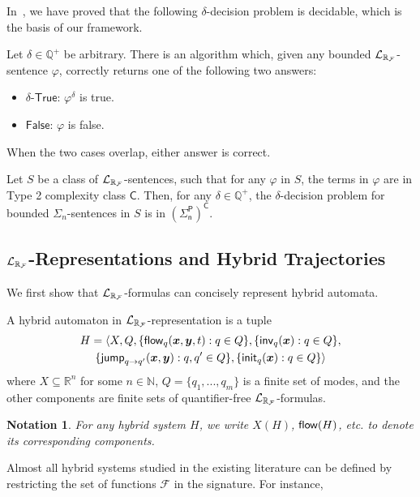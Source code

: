 \documentclass[10pt,envcountsect]{llncs}
\newtheorem{notation}[theorem]{Notation}
\begin{document}
In~\cite{DBLP:conf/lics/GaoAC12,DBLP:conf/cade/GaoAC12}, we have proved that the following $\delta$-decision problem is decidable, which is the basis of our framework.
\begin{theorem}\label{delta-decide} Let $\delta\in\mathbb{Q}^+$ be
arbitrary. There is an algorithm which, given any bounded $\mathcal{L}_{\mathbb{R}_{\mathcal{F}}}$-sentence $\varphi$,
correctly returns one of the following two answers:
\begin{itemize}
\item $\delta$-$\mathsf{True}$: $\varphi^{\delta}$ is true.
\item $\mathsf{False}$: $\varphi$ is false.
\end{itemize}
When the two cases overlap, either answer is correct.
\end{theorem}
\begin{theorem}[Complexity]\label{compmain}
Let $S$ be a class of $\mathcal{L}_{\mathbb{R}_{\mathcal{F}}}$-sentences, such that for any $\varphi$ in $S$, the terms in $\varphi$ are in Type 2 complexity class $\mathsf{C}$. Then, for any $\delta\in \mathbb{Q}^+$, the $\delta$-decision problem for bounded $\Sigma_n$-sentences in $S$ is in $\mathsf{(\Sigma_n^P)^C}$.
\end{theorem}
\subsection{{\large$\mathcal{L}_{\mathbb{R}_{\mathcal{F}}}$}-Representations and Hybrid Trajectories}\label{language}
We first show that $\mathcal{L}_{\mathbb{R}_{\mathcal{F}}}$-formulas can concisely represent hybrid automata.
\begin{definition}\label{lrf-definition}
A hybrid automaton in $\mathcal{L}_{\mathbb{R}_{\mathcal{F}}}$-representation is a tuple
\begin{multline*}
H = \langle X, Q, \{{\flow}_q(\vec x, \vec y, t): q\in Q\},\{\inv_q(\vec x): q\in Q\},\\
\{\jump_{q\rightarrow q'}(\vec x, \vec y): q,q'\in Q\},\{\init_q(\vec x): q\in Q\}\rangle
\end{multline*}
where $X\subseteq \mathbb{R}^n$ for some $n\in \mathbb{N}$, $Q=\{q_1,...,q_m\}$ is a finite set of modes, and the other components are finite sets of quantifier-free $\mathcal{L}_{\mathbb{R}_{\mathcal{F}}}$-formulas.
\end{definition}
\begin{notation}
For any hybrid system $H$, we write $X(H)$, $\mathsf{flow}(H)$, etc. to denote its corresponding components.
\end{notation}
Almost all hybrid systems studied in the existing literature can be defined by restricting the set of functions $\mathcal{F}$ in the signature. For instance,
\end{document}
